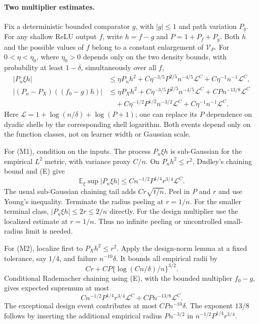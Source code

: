 \paragraph{Two multiplier estimates.}
Fix a deterministic bounded comparator $g$, with $|g|\le1$ and
path variation $P_g$. For any shallow ReLU output $f$, write
$h=f-g$ and $P=1+P_f+P_g$. Both $h$ and the possible values of $f$
belong to a constant enlargement of $\mathcal V_P$.
For $0<\eta<\eta_0$, where $\eta_0>0$ depends only on the two density bounds, with probability at least $1-\delta$,
simultaneously over all $f$,
\begin{align}
 |P_n\xi h|
 &\le \eta P_nh^2+
 C\eta^{-3/5}P^{2/5}n^{-4/5}\mathcal L^C
 +C\eta^{-1}n^{-1}\mathcal L^C, \tag{M1}\\
 |(P_n-P_X)((f_0-g)h)|
 &\le \eta P_Xh^2+
 C\eta^{-3/5}P^{2/5}n^{-4/5}\mathcal L^C
 +CPn^{-13/8}\mathcal L^C\\
 &\quad+C\eta^{-1/2}P^{1/2}n^{-3/2}\mathcal L^C
 +C\eta^{-1}n^{-1}\mathcal L^C. \tag{M2}
\end{align}
Here $\mathcal L=1+\log(n/\delta)+\log(P+1)$; one can replace its
$P$ dependence on dyadic shells by the corresponding shell logarithm.
Both events depend only on the function classes, not on learner
width or Gaussian scale.

For (M1), condition on the inputs. The process $P_n\xi h$ is
sub-Gaussian for the empirical $L^2$ metric, with variance proxy
$C/n$. On $P_nh^2\le r^2$, Dudley's chaining bound and (E) give
\[
 \mathbb E_\xi\sup |P_n\xi h|
 \le C n^{-1/2}P^{1/4}r^{3/4}\mathcal L^C.
\]
The usual sub-Gaussian chaining tail adds
$Cr\sqrt{t/n}$. Peel in $P$ and $r$ and use Young's inequality.
Terminate the radius peeling at $r=1/n$. For the smaller terminal
class, $|P_n\xi h|\le2r\le2/n$ directly. For the design
multiplier use the localized estimate at $r=1/n$. Thus no infinite
peeling or uncontrolled small-radius limit is needed.

For (M2), localize first to $P_Xh^2\le r^2$. Apply the design-norm
lemma at a fixed tolerance, say $1/4$, and failure $n^{-10}\delta$.
It bounds all empirical radii by
\[
 C r+C P\{\log(Cn/\delta)/n\}^{3/2}.
\]
Conditional Rademacher chaining using (E), with the bounded
multiplier $f_0-g$, gives expected supremum at most
\[
 C n^{-1/2}P^{1/4}r^{3/4}\mathcal L^C
       +CPn^{-13/8}\mathcal L^C.
\]
The exceptional design event contributes at most $CPn^{-10}\delta$.
The exponent $13/8$ follows by inserting the additional empirical
radius $P n^{-3/2}$ in $n^{-1/2}P^{1/4}r^{3/4}$.

